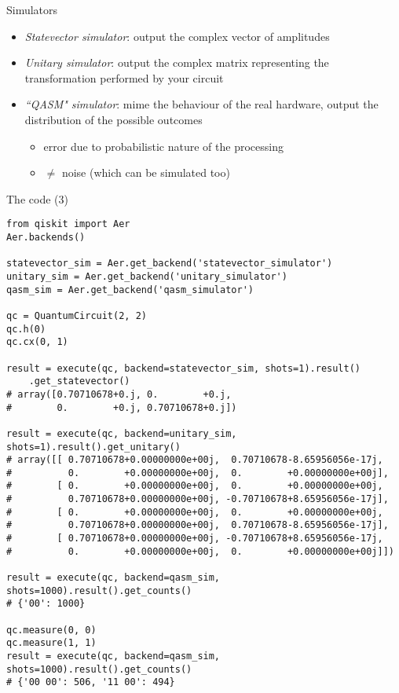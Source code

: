 \begin{frame}{Simulators}
\begin{itemize}
    \item<1-> \emph{Statevector simulator}: output the complex vector of amplitudes
    \item<2-> \emph{Unitary simulator}: output the complex matrix representing the transformation performed by your circuit
    \item<3-> \emph{``QASM" simulator}: mime the behaviour of the real hardware, output the distribution of the possible outcomes
    \begin{itemize}
        \item<4-> error due to probabilistic nature of the processing
        \item<5-> \(\neq\) noise (which can be simulated too)
    \end{itemize}
\end{itemize}
\end{frame}

\begin{frame}[fragile]{The code (3)}
\begin{verbatim}
from qiskit import Aer
Aer.backends()

statevector_sim = Aer.get_backend('statevector_simulator')
unitary_sim = Aer.get_backend('unitary_simulator')
qasm_sim = Aer.get_backend('qasm_simulator')

qc = QuantumCircuit(2, 2)
qc.h(0)
qc.cx(0, 1)

result = execute(qc, backend=statevector_sim, shots=1).result()
    .get_statevector()
# array([0.70710678+0.j, 0.        +0.j, 
#        0.        +0.j, 0.70710678+0.j])

result = execute(qc, backend=unitary_sim, shots=1).result().get_unitary()
# array([[ 0.70710678+0.00000000e+00j,  0.70710678-8.65956056e-17j,
#          0.        +0.00000000e+00j,  0.        +0.00000000e+00j],
#        [ 0.        +0.00000000e+00j,  0.        +0.00000000e+00j,
#          0.70710678+0.00000000e+00j, -0.70710678+8.65956056e-17j],
#        [ 0.        +0.00000000e+00j,  0.        +0.00000000e+00j,
#          0.70710678+0.00000000e+00j,  0.70710678-8.65956056e-17j],
#        [ 0.70710678+0.00000000e+00j, -0.70710678+8.65956056e-17j,
#          0.        +0.00000000e+00j,  0.        +0.00000000e+00j]])

result = execute(qc, backend=qasm_sim, shots=1000).result().get_counts()
# {'00': 1000}

qc.measure(0, 0)
qc.measure(1, 1)
result = execute(qc, backend=qasm_sim, shots=1000).result().get_counts()
# {'00 00': 506, '11 00': 494}
\end{verbatim}
\end{frame}


